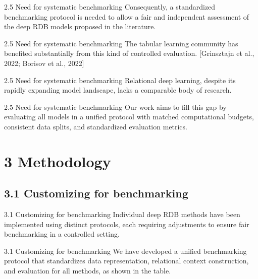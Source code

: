 \documentclass[aspectratio=169,10pt]{beamer}
\newcommand{\cit}[1]{{\scriptsize\color{gray}[#1]}}
\begin{document}
\begin{frame}{2.5 Need for systematic benchmarking}
Consequently, a standardized benchmarking protocol is needed to allow a fair and independent assessment of the deep RDB models proposed in the literature.
\end{frame}

\begin{frame}{2.5 Need for systematic benchmarking}
The tabular learning community has benefited substantially from this kind of controlled evaluation.
\cit{Grinsztajn et al., 2022; Borisov et al., 2022}
\end{frame}

\begin{frame}{2.5 Need for systematic benchmarking}
Relational deep learning, despite its rapidly expanding model landscape, lacks a comparable body of research.
\end{frame}

\begin{frame}{2.5 Need for systematic benchmarking}
Our work aims to fill this gap by evaluating all models in a unified protocol with matched computational budgets, consistent data splits, and standardized evaluation metrics.
\end{frame}

\section{3 Methodology}
\subsection{3.1 Customizing for benchmarking}

\begin{frame}{3.1 Customizing for benchmarking}
Individual deep RDB methods have been implemented using distinct protocols, each requiring adjustments to ensure fair benchmarking in a controlled setting.
\end{frame}

\begin{frame}{3.1 Customizing for benchmarking}
We have developed a unified benchmarking protocol that standardizes data representation, relational context construction, and evaluation for all methods, as shown in the table.
\end{frame}
\end{document}
